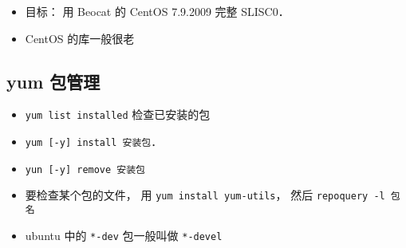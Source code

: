 
\begin{issues}
\issueDraft
\end{issues}

\begin{itemize}
\item 目标： 用 Beocat 的 CentOS 7.9.2009 完整 SLISC0．
\item CentOS 的库一般很老
\end{itemize}

\subsection{yum 包管理}
\begin{itemize}
\item \verb|yum list installed| 检查已安装的包
\item \verb|yum [-y] install 安装包|．
\item \verb|yun [-y] remove 安装包|
\item 要检查某个包的文件， 用 \verb|yum install yum-utils|， 然后 \verb|repoquery -l 包名|
\item ubuntu 中的 \verb|*-dev| 包一般叫做 \verb|*-devel|
\end{itemize}
